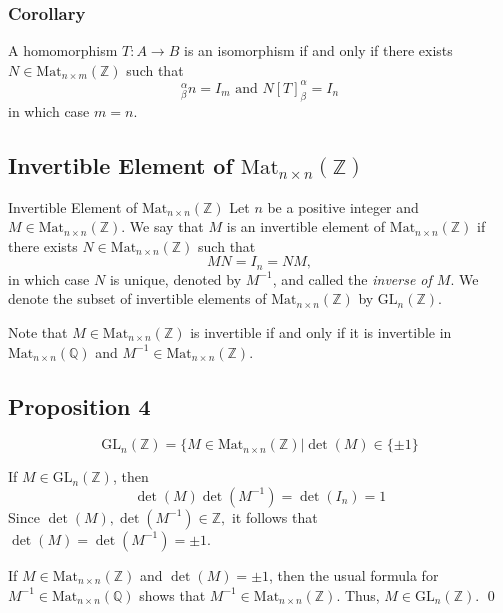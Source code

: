 \documentclass{article}
\renewenvironment{proof}{{\bfseries\color{blue1} Proof:}}{\qed}
\begin{document}
\subsubsection{Corollary}
\begin{idea}
    A homomorphism $T:A\rightarrow B$ is an isomorphism if and only if there exists $N\in \text{Mat}_{n\times m}(\mathbb{Z})$ such that
    \begin{equation}
        [T]^\alpha_\beta n = I_m \text{ and } N[T]^\alpha_\beta = I_n
    \end{equation}
    in which case $m=n$.
\end{idea}
\subsection{Invertible Element of \texorpdfstring{$\text{Mat}_{n\times n}(\mathbb{Z})$}{Mat(nxn)(Z)}}
\begin{definition}{Invertible Element of $\text{Mat}_{n\times n}(\mathbb{Z})$}
    Let $n$ be a positive integer and $M \in \text{Mat}_{n\times n}(\mathbb{Z})$. We say that $M$ is an invertible element of $\text{Mat}_{n\times n}(\mathbb{Z})$ if there exists $N\in \text{Mat}_{n\times n}(\mathbb{Z})$ such that
    \begin{equation}
        MN = I_n = NM,
    \end{equation}
    in which case $N$ is unique, denoted by $M^{-1}$, and called the \textit{inverse of $M$}. We denote the subset of invertible elements of $\text{Mat}_{n\times n}(\mathbb{Z})$ by $\text{GL}_n(\mathbb{Z})$.
\end{definition}
Note that $M \in \text{Mat}_{n\times n}(\mathbb{Z})$ is invertible if and only if it is invertible in $\text{Mat}_{n\times n}(\mathbb{Q})$ and $M^{-1} \in \text{Mat}_{n\times n}(\mathbb{Z})$.
\subsection{Proposition 4}
\begin{idea}
    \begin{equation}
        \text{GL}_n(\mathbb{Z}) = \{M \in \text{Mat}_{n\times n}(\mathbb{Z}) \vert \det(M) \in \{\pm 1\}
    \end{equation}
\end{idea}
\begin{proof}
    If $M\in \text{GL}_n(\mathbb{Z})$, then
    \begin{equation}
        \det(M)\det(M^{-1})=\det(I_n) = 1
    \end{equation}
    Since $\det(M),\det(M^{-1}) \in \mathbb{Z},$ it follows that $\det(M)=\det(M^{-1})=\pm 1$.

    If $M\in \text{Mat}_{n\times n}(\mathbb{Z})$ and $\det(M) = \pm 1$, then the usual formula for $M^{-1}\in \text{Mat}_{n\times n}(\mathbb{Q})$ shows that $M^{-1}\in \text{Mat}_{n\times n}(\mathbb{Z})$. Thus, $M \in \text{GL}_n(\mathbb{Z}).$
\end{proof}
\end{document}
